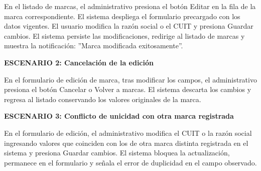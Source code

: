 \documentclass[a4paper,9pt]{article}
\begin{document}
\begin{tcolorbox}[hucard, title={\textbf{HU-254: MODIFICAR MARCA PROVEEDORA} \hfill \scriptsize \colorbox{bluestatus}{\textbf{\ New\ }} \quad \colorbox{white}{\textcolor{primarydark}{\textbf{\ 0 pts\ }}}}]
{En el listado de marcas, el administrativo presiona el botón Editar en la fila de la marca correspondiente. El sistema despliega el formulario precargado con los datos vigentes. El usuario modifica la razón social o el CUIT y presiona Guardar cambios. El sistema persiste las modificaciones, redirige al listado de marcas y muestra la notificación: ''Marca modificada exitosamente''.\par\vspace{2.5pt}
\noindent\textbf{\textcolor{secondarydark}{ESCENARIO 2:  Cancelación de la edición}}\par\vspace{1pt}
En el formulario de edición de marca, tras modificar los campos, el administrativo presiona el botón Cancelar o Volver a marcas. El sistema descarta los cambios y regresa al listado conservando los valores originales de la marca.\par\vspace{2.5pt}
\noindent\textbf{\textcolor{secondarydark}{ESCENARIO 3:  Conflicto de unicidad con otra marca registrada}}\par\vspace{1pt}
En el formulario de edición, el administrativo modifica el CUIT o la razón social ingresando valores que coinciden con los de otra marca distinta registrada en el sistema y presiona Guardar cambios. El sistema bloquea la actualización, permanece en el formulario y señala el error de duplicidad en el campo observado.\par\vspace{2.5pt}
}\par
\end{tcolorbox}
\end{document}
